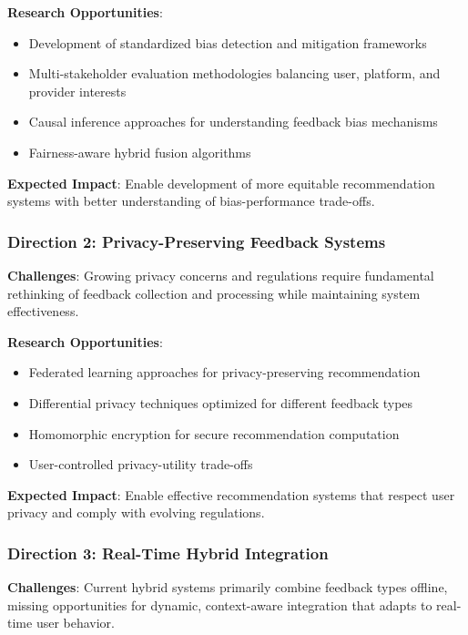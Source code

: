 \textbf{Research Opportunities}:
\begin{itemize}
    \item Development of standardized bias detection and mitigation frameworks
    \item Multi-stakeholder evaluation methodologies balancing user, platform, and provider interests
    \item Causal inference approaches for understanding feedback bias mechanisms
    \item Fairness-aware hybrid fusion algorithms
\end{itemize}

\textbf{Expected Impact}: Enable development of more equitable recommendation systems with better understanding of bias-performance trade-offs.

\subsubsection{Direction 2: Privacy-Preserving Feedback Systems}

\textbf{Challenges}:
Growing privacy concerns and regulations require fundamental rethinking of feedback collection and processing while maintaining system effectiveness.

\textbf{Research Opportunities}:
\begin{itemize}
    \item Federated learning approaches for privacy-preserving recommendation
    \item Differential privacy techniques optimized for different feedback types
    \item Homomorphic encryption for secure recommendation computation
    \item User-controlled privacy-utility trade-offs
\end{itemize}

\textbf{Expected Impact}: Enable effective recommendation systems that respect user privacy and comply with evolving regulations.

\subsubsection{Direction 3: Real-Time Hybrid Integration}

\textbf{Challenges}:
Current hybrid systems primarily combine feedback types offline, missing opportunities for dynamic, context-aware integration that adapts to real-time user behavior.


